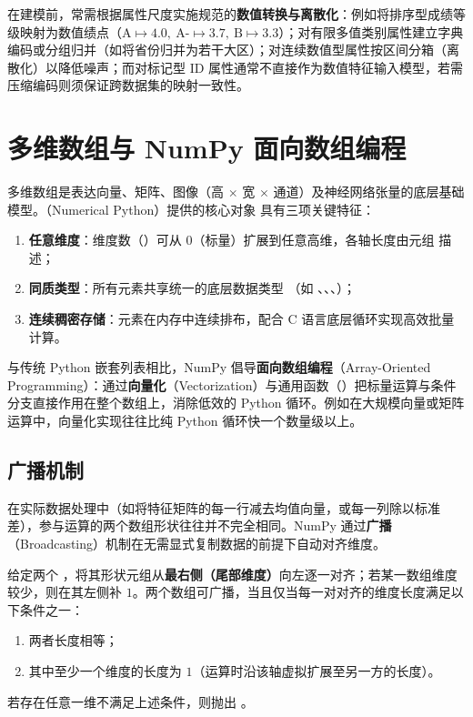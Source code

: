 在建模前，常需根据属性尺度实施规范的\textbf{数值转换与离散化}：例如将排序型成绩等级映射为数值绩点（$\text{A}\mapsto 4.0,\ \text{A-}\mapsto 3.7,\ \text{B}\mapsto 3.3$）；对有限多值类别属性建立字典编码或分组归并（如将省份归并为若干大区）；对连续数值型属性按区间分箱（离散化）以降低噪声；而对标记型 ID 属性通常不直接作为数值特征输入模型，若需压缩编码则须保证跨数据集的映射一致性。

\section{多维数组与 NumPy 面向数组编程}\label{sec:numpy}

多维数组是表达向量、矩阵、图像（高 $\times$ 宽 $\times$ 通道）及神经网络张量的底层基础模型。（Numerical Python）提供的核心对象  具有三项关键特征：
\begin{enumerate}
  \item \textbf{任意维度}：维度数（）可从 $0$（标量）扩展到任意高维，各轴长度由元组  描述；
  \item \textbf{同质类型}：所有元素共享统一的底层数据类型 （如 、、、）；
  \item \textbf{连续稠密存储}：元素在内存中连续排布，配合 C 语言底层循环实现高效批量计算。
\end{enumerate}

与传统 Python 嵌套列表相比，NumPy 倡导\textbf{面向数组编程}（Array-Oriented Programming）：通过\textbf{向量化}（Vectorization）与通用函数（）把标量运算与条件分支直接作用在整个数组上，消除低效的 Python  循环。例如在大规模向量或矩阵运算中，向量化实现往往比纯 Python 循环快一个数量级以上。

\subsection{广播机制}

在实际数据处理中（如将特征矩阵的每一行减去均值向量，或每一列除以标准差），参与运算的两个数组形状往往并不完全相同。NumPy 通过\textbf{广播}（Broadcasting）机制在无需显式复制数据的前提下自动对齐维度。

\begin{definition}\label{def:broadcasting}
给定两个 ，将其形状元组从\textbf{最右侧（尾部维度）}向左逐一对齐；若某一数组维度较少，则在其左侧补 $1$。两个数组可广播，当且仅当每一对对齐的维度长度满足以下条件之一：
\begin{enumerate}
  \item 两者长度相等；
  \item 其中至少一个维度的长度为 $1$（运算时沿该轴虚拟扩展至另一方的长度）。
\end{enumerate}
若存在任意一维不满足上述条件，则抛出 。
\end{definition}

